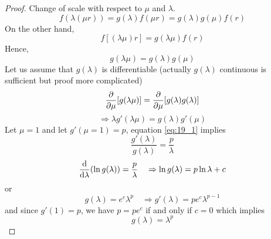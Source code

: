\documentclass[../main/main.tex]{subfiles}
\begin{document}
\begin{proof}
Change of scale with respect to \( \mu  \) and \( \lambda  \).
\begin{equation}
  f(\lambda (\mu r)) = g (\lambda ) f(\mu r) = g(\lambda ) g(\mu ) f(r)
\end{equation}
On the other hand,
\begin{equation}
  f[(\lambda \mu )r] = g (\lambda  \mu ) f(r)
\end{equation}
Hence,
\begin{equation}
  g (\lambda \mu ) = g(\lambda ) g (\mu )
\end{equation}
Let us assume that \( g(\lambda ) \) is differentiable (actually \( g(\lambda ) \) continuous is sufficient but proof more complicated)
\begin{equation}
  \pdv{}{\mu } \qty[g(\lambda \mu )] = \pdv{}{\mu } \qty[ g(\lambda )g(\lambda )]
\end{equation}
\begin{equation}
  \Rightarrow \lambda g' (\lambda \mu ) = g (\lambda ) g' (\mu )
  \label{eq:19_1}
\end{equation}
Let \( \mu =1 \) and let \( g'(\mu =1) = p \), equation \eqref{eq:19_1} implies
\begin{equation}
  \frac{g'(\lambda )}{g(\lambda )} = \frac{p}{\lambda }
\end{equation}
\begin{equation}
  \dv{}{\lambda } \qty(\ln{g(\lambda )} ) = \frac{p}{\lambda }   \quad \Rightarrow \ln{g(\lambda )} = p \ln{\lambda } + c
\end{equation}
or
\begin{equation}
  g (\lambda ) = e^c \lambda ^p \quad \Rightarrow g'(\lambda ) = p e^c \lambda ^{p-1}
\end{equation}
and since \( g'(1) = p \), we have \( p=p e^c \) if and only if \( c=0 \) which implies
\begin{equation}
  g(\lambda ) = \lambda ^ p
\end{equation}
\end{proof}
\end{document}

